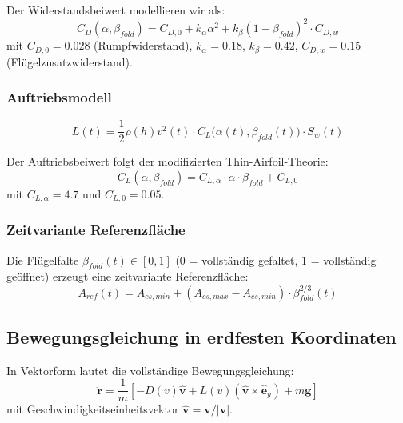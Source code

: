 ﻿\documentclass[12pt,a4paper]{article}
\theoremstyle{remark}
\begin{document}
	Der Widerstandsbeiwert modellieren wir als:
	\begin{equation}
		C_D(\alpha, \beta_{fold}) = C_{D,0} + k_\alpha \alpha^2 + k_\beta (1 - \beta_{fold})^2 \cdot C_{D,w}
		\label{eq:cd_model}
	\end{equation}
	mit $C_{D,0} = 0.028$ (Rumpfwiderstand), $k_\alpha = 0.18$, $k_\beta = 0.42$, $C_{D,w} = 0.15$ (Flügelzusatzwiderstand).
	
	\subsubsection{Auftriebsmodell}
	
	\begin{equation}
		L(t) = \frac{1}{2}\rho(h) v^2(t) \cdot C_L\bigl(\alpha(t), \beta_{fold}(t)\bigr) \cdot S_w(t)
		\label{eq:lift}
	\end{equation}
	
	Der Auftriebsbeiwert folgt der modifizierten Thin-Airfoil-Theorie:
	\begin{equation}
		C_L(\alpha, \beta_{fold}) = C_{L,\alpha} \cdot \alpha \cdot \beta_{fold} + C_{L,0}
	\end{equation}
	mit $C_{L,\alpha} = 4.7$ und $C_{L,0} = 0.05$.
	
	\subsubsection{Zeitvariante Referenzfläche}
	
	Die Flügelfalte $\beta_{fold}(t) \in [0, 1]$ ($0$ = vollständig gefaltet, $1$ = vollständig geöffnet) erzeugt eine zeitvariante Referenzfläche:
	\begin{equation}
		A_{ref}(t) = A_{cs,min} + (A_{cs,max} - A_{cs,min}) \cdot \beta_{fold}^{2/3}(t)
		\label{eq:aref}
	\end{equation}
	
	\subsection{Bewegungsgleichung in erdfesten Koordinaten}
	
	In Vektorform lautet die vollständige Bewegungsgleichung:
	\begin{equation}
		\ddot{\mathbf{r}} = \frac{1}{m}\left[- D(v) \hat{\mathbf{v}} + L(v)(\hat{\mathbf{v}} \times \hat{\mathbf{e}}_y) + m\mathbf{g}\right]
		\label{eq:eom_full}
	\end{equation}
	mit Geschwindigkeitseinheitsvektor $\hat{\mathbf{v}} = \mathbf{v}/|\mathbf{v}|$.
	
\end{document}
